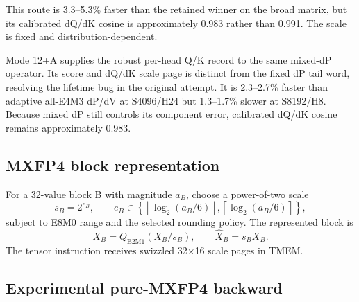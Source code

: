 This route is 3.3--5.3\% faster than the retained winner on the broad matrix,
but its calibrated dQ/dK cosine is approximately 0.983 rather than 0.991.
The scale is fixed and distribution-dependent.

Mode 12+A supplies the robust per-head Q/K record to the same mixed-dP
operator.  Its score and dQ/dK scale page is distinct from the fixed dP tail
word, resolving the lifetime bug in the original attempt.  It is 2.3--2.7\%
faster than adaptive all-E4M3 dP/dV at S4096/H24 but 1.3--1.7\% slower at
S8192/H8.  Because mixed dP still controls its component error, calibrated
dQ/dK cosine remains approximately 0.983.

\subsection{MXFP4 block representation}

For a 32-value block B with magnitude $a_B$, choose a power-of-two scale
\begin{equation}
  s_B=2^{e_B},\qquad
  e_B\in
  \left\{
    \left\lfloor\log_2(a_B/6)\right\rfloor,
    \left\lceil\log_2(a_B/6)\right\rceil
  \right\},
  \label{eq:mxfp4-block-scale}
\end{equation}
subject to E8M0 range and the selected rounding policy.  The represented
block is
\begin{equation}
  \bar X_B=Q_{\mathrm{E2M1}}(X_B/s_B),\qquad
  \widehat X_B=s_B\bar X_B.
  \label{eq:mxfp4-block}
\end{equation}
The tensor instruction receives swizzled 32$\times$16 scale pages in TMEM.

\subsection{Experimental pure-MXFP4 backward}

